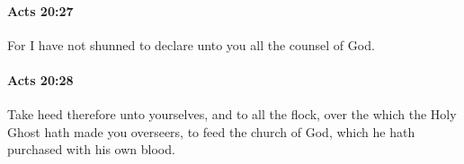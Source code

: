 		\paragraph{Acts 20:27} %
			\label{ACTS-20-27}

			For I have not shunned to declare unto you all the counsel of God.

			\begin{framed}
			\scriptsize
				\begin{compactdesc}
					\item[SBLG] 
				\end{compactdesc}
			\end{framed}

		\paragraph{Acts 20:28} %
			\label{ACTS-20-28}

			Take heed therefore unto yourselves, and to all the flock, over the which the Holy Ghost hath made you overseers, to feed the church of God, which he hath purchased with his own blood.


